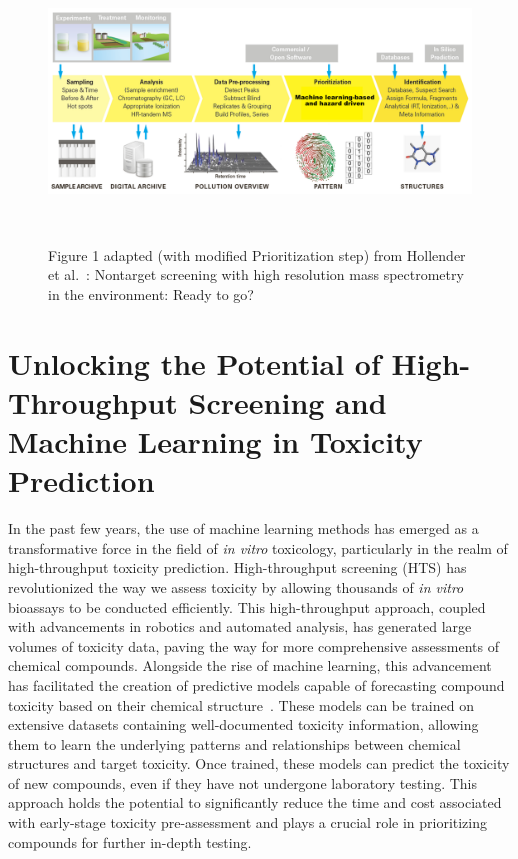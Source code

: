 \begin{figure}[htbp]  %
    \centering
    \includegraphics[width=1.0\textwidth]{figures/non_target_high_resolution_mass_spectrometry_1.png}  
    \caption{Figure 1 adapted (with modified Prioritization step) from Hollender et al.~\cite{hollender}: Nontarget screening with high resolution mass spectrometry in the environment: Ready to go? }
~\label{fig:non_target_high_resolution_mass_spectrometry} 
\end{figure}

\section{Unlocking the Potential of High-Throughput Screening and Machine Learning in Toxicity Prediction}

In the past few years, the use of machine learning methods has emerged as a transformative force in the field of \emph{in vitro} toxicology, particularly in the realm of high-throughput toxicity prediction. High-throughput screening (HTS) has revolutionized the way we assess toxicity by allowing thousands of \emph{in vitro} bioassays to be conducted efficiently. This high-throughput approach, coupled with advancements in robotics and automated analysis, has generated large volumes of toxicity data, paving the way for more comprehensive assessments of chemical compounds.
Alongside the rise of machine learning, this advancement has facilitated the creation of predictive models capable of forecasting compound toxicity based on their chemical structure~\cite{banerjee2018}. These models can be trained on extensive datasets containing well-documented toxicity information, allowing them to learn the underlying patterns and relationships between chemical structures and target toxicity. Once trained, these models can predict the toxicity of new compounds, even if they have not undergone laboratory testing. This approach holds the potential to significantly reduce the time and cost associated with early-stage toxicity pre-assessment and plays a crucial role in prioritizing compounds for further in-depth testing.

